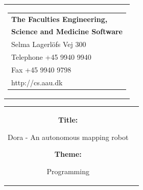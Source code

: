 

\thispagestyle{empty}
\begin{titlepage}
\begin{nopagebreak}
{\samepage 
\begin{tabular}{r}
\parbox{\textwidth}{  
\hfill \parbox{4.9cm}{\begin{tabular}{l}
{\sf\small \textbf{The Faculties Engineering,}}\\
{\sf\small \textbf{Science and Medicine Software}}\\
{\sf\small Selma Lagerlöfs Vej 300} \\
{\sf\small Telephone +45 9940 9940} \\
{\sf\small Fax +45 9940 9798} \\
{\sf\small http://cs.aau.dk}
\end{tabular}}}
\\
\end{tabular}
\begin{tabular}{cc}
\parbox{7cm}{
\begin{description}

\item {\bf Title:} 

Dora - An autonomous mapping robot
  
\item {\bf Theme:} 

Programming

\end{description}

\parbox{8cm}{

}}
\end{tabular}}
\end{nopagebreak}
\end{titlepage}
